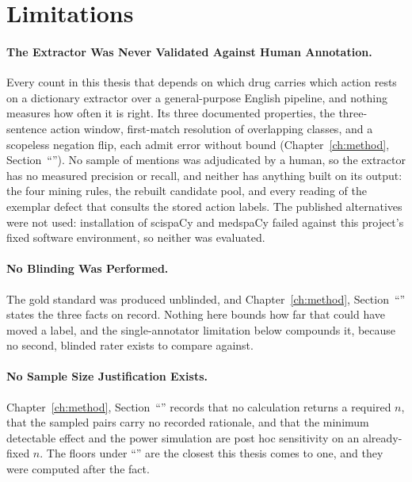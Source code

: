 \section{Limitations}
\label{sec:disc-limits}

\paragraph{The Extractor Was Never Validated Against Human Annotation.} Every
count in this thesis that depends on which drug carries which action rests on a
dictionary extractor over a general-purpose English pipeline, and nothing
measures how often it is right. Its three documented properties, the three-sentence action window, first-match resolution of
overlapping classes, and a scopeless negation flip, each admit error without bound
(Chapter~\ref{ch:method}, Section~``''). No sample of mentions
was adjudicated by a human, so the extractor has no measured precision or recall,
and neither has anything built on its output: the four mining rules, the rebuilt
candidate pool, and every reading of the exemplar defect that consults the stored
action labels. The published alternatives were not used: installation of scispaCy
and medspaCy failed against this project's fixed software environment, so neither was
evaluated. 

\paragraph{No Blinding Was Performed.} The gold standard was produced unblinded,
and Chapter~\ref{ch:method}, Section~``'' states the three facts on
record. Nothing here bounds how far that could have
moved a label, and the single-annotator limitation below compounds it, because no
second, blinded rater exists to compare against.

\paragraph{No Sample Size Justification Exists.} Chapter~\ref{ch:method}, Section~``'' records that no calculation
returns a required $n$, that the sampled pairs carry no recorded rationale, and that the
minimum detectable effect and the power simulation are post hoc sensitivity on an already-fixed $n$. The floors under ``''
are the closest this thesis comes to one, and they were computed after the fact.

